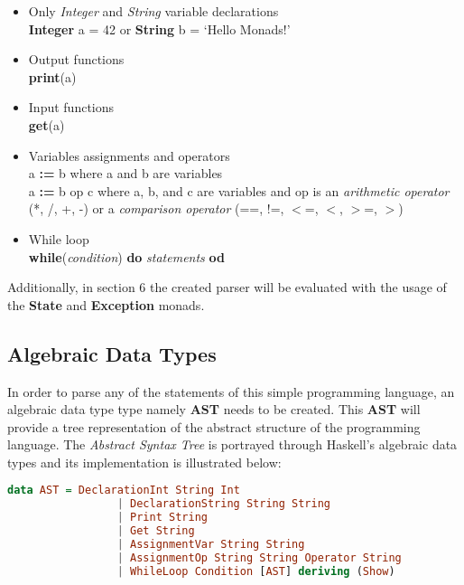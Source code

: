 \documentclass[a4paper, onecolumn]{article}
\begin{document}
    \begin{itemize}
        \item Only \textit{Integer} and \textit{String} variable declarations \\
        \textbf{Integer} a = 42 or \textbf{String} b = `Hello Monads!'
        \item Output functions \\ 
        \textbf{print}(a)
        \item Input functions \\
        \textbf{get}(a)
        \item Variables assignments and operators \\ 
        a \textbf{:=} b where a and b are variables \\ 
        a \textbf{:=} b op c where a, b, and c are variables and op is an \textit{arithmetic operator} (*, /, +, -) or a \textit{comparison operator} (==, !=, $<$=, $<$, $>$=, $>$) 
        \item While loop \\ 
        \textbf{while}(\textit{condition}) \textbf{do} \textit{statements} \textbf{od}
    \end{itemize}
    
    \noindent Additionally, in section 6 the created parser will be evaluated with the usage of the \textbf{State} and \textbf{Exception} monads. 
    
    \subsection{Algebraic Data Types}
    
    In order to parse any of the statements of this simple programming language, an algebraic data type type namely \textbf{AST} needs to be created. This \textbf{AST} will provide a tree representation of the abstract structure of the programming language. The \textit{Abstract Syntax Tree} is portrayed through Haskell's algebraic data types and its implementation is illustrated below:
    
    \begin{tcolorbox}
    \begin{lstlisting}[language=Haskell] 
        data AST = DeclarationInt String Int 
                 | DeclarationString String String
                 | Print String
                 | Get String
                 | AssignmentVar String String
                 | AssignmentOp String String Operator String 
                 | WhileLoop Condition [AST] deriving (Show)
    \end{lstlisting}
    \end{tcolorbox}
    
\end{document}
